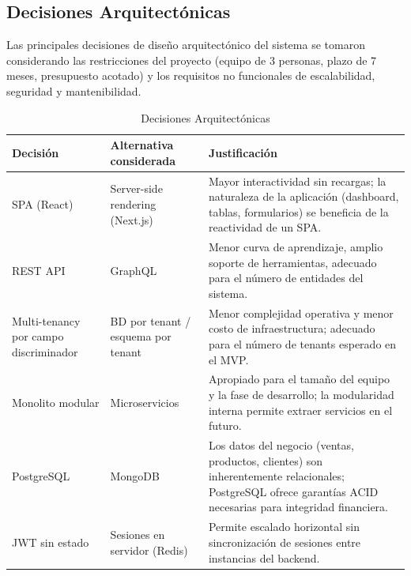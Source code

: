 \subsection{Decisiones Arquitectónicas}\label{decisiones-arquitectuxf3nicas}

Las principales decisiones de diseño arquitectónico del sistema se tomaron considerando las restricciones del proyecto (equipo de 3 personas, plazo de 7 meses, presupuesto acotado) y los requisitos no funcionales de escalabilidad, seguridad y mantenibilidad.

\begin{longtable}[]{@{}
  >{\raggedright\arraybackslash}p{}
  >{\raggedright\arraybackslash}p{}
  >{\raggedright\arraybackslash}p{}@{}}
\caption[Decisiones Arquitectónicas]{Decisiones Arquitectónicas}\tabularnewline
\toprule\noalign{}
\begin{minipage}[b]{\linewidth}\raggedright
Decisión
\end{minipage} & \begin{minipage}[b]{\linewidth}\raggedright
Alternativa considerada
\end{minipage} & \begin{minipage}[b]{\linewidth}\raggedright
Justificación
\end{minipage} \\
\midrule\noalign{}
\endhead
\bottomrule\noalign{}
\endlastfoot
SPA (React) & Server-side rendering (Next.js) & Mayor interactividad sin recargas; la naturaleza de la aplicación (dashboard, tablas, formularios) se beneficia de la reactividad de un SPA. \\
REST API & GraphQL & Menor curva de aprendizaje, amplio soporte de herramientas, adecuado para el número de entidades del sistema. \\
Multi-tenancy por campo discriminador & BD por tenant / esquema por tenant & Menor complejidad operativa y menor costo de infraestructura; adecuado para el número de tenants esperado en el MVP. \\
Monolito modular & Microservicios & Apropiado para el tamaño del equipo y la fase de desarrollo; la modularidad interna permite extraer servicios en el futuro. \\
PostgreSQL & MongoDB & Los datos del negocio (ventas, productos, clientes) son inherentemente relacionales; PostgreSQL ofrece garantías ACID necesarias para integridad financiera. \\
JWT sin estado & Sesiones en servidor (Redis) & Permite escalado horizontal sin sincronización de sesiones entre instancias del backend. \\
\end{longtable}


